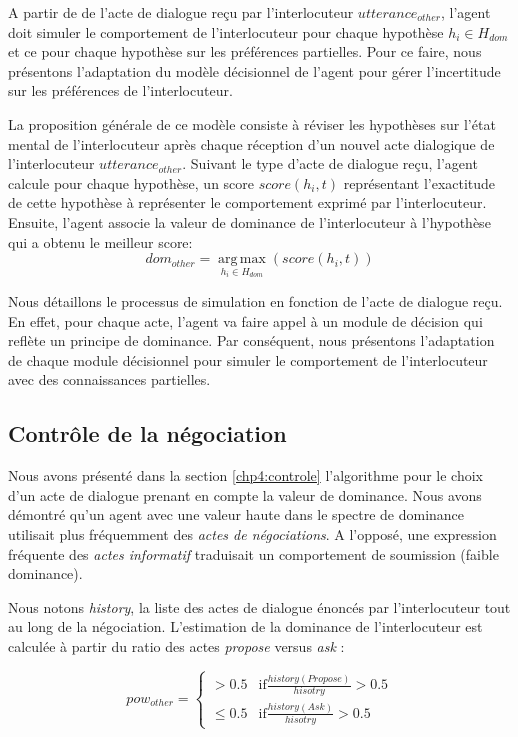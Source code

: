 	A partir de de l'acte de dialogue reçu par l'interlocuteur $utterance_{other}$, l'agent doit simuler le comportement de l'interlocuteur pour chaque hypothèse $h_i \in H_{dom}$ et ce pour chaque hypothèse sur les préférences partielles. Pour ce faire, nous présentons l'adaptation du modèle décisionnel de l'agent pour gérer l'incertitude sur les préférences de l'interlocuteur. 
	

	La proposition générale de ce modèle consiste à réviser les hypothèses sur l'état mental de l'interlocuteur après chaque réception d'un nouvel acte dialogique de l'interlocuteur $utterance_{other}$. Suivant le type d'acte de dialogue reçu, l'agent calcule pour chaque hypothèse, un score $score(h_i,t)$ représentant l'exactitude de cette hypothèse à représenter le comportement exprimé par l'interlocuteur. Ensuite, l'agent associe la valeur de dominance de l'interlocuteur à l'hypothèse qui a obtenu le meilleur score:
				\begin{equation}
				dom_{other} = \operatorname*{arg\,max}_{h_i \in H_{dom}} (score(h_i,t))
				\end{equation}
		
	Nous détaillons le processus de simulation en fonction de l'acte de dialogue reçu. En effet, pour chaque acte, l'agent va faire appel à un module de décision qui reflète un principe de dominance. Par conséquent, nous présentons l'adaptation de chaque module décisionnel pour simuler le comportement de l'interlocuteur avec des connaissances partielles. 
	
	\subsection{Contrôle de la négociation}	
	
	Nous avons présenté dans la section \ref{chp4:controle} l'algorithme pour le choix d'un acte de dialogue prenant en compte la valeur de dominance. Nous avons démontré qu'un agent avec une valeur haute dans le spectre de dominance utilisait plus fréquemment des \emph{actes de négociations}. A l'opposé, une expression fréquente des \emph{actes informatif} traduisait un comportement de soumission (faible dominance). 
	
	Nous notons \textit{history}, la liste des actes de dialogue énoncés par l'interlocuteur tout au long de la négociation. L'estimation de la dominance de l'interlocuteur est calculée à partir du ratio des actes \emph{propose} versus \emph{ask} :
		
		\begin{equation}
		pow_{other} = \left\{\begin{array}{ll}
		> 0.5 & \mathrm{if } \frac{history(Propose)}{hisotry} > 0.5\\
		\leq 0.5 & \mathrm{if  } \frac{history(Ask)}{hisotry} > 0.5
		\end{array}\right.
		\end{equation}
		
